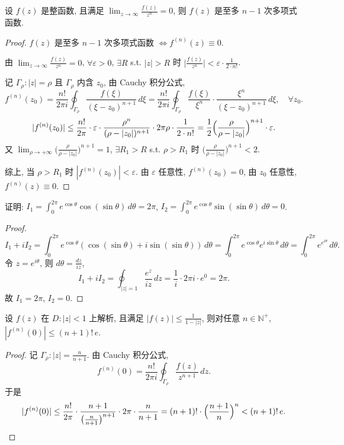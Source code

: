 \documentclass[theorem=false,mathfont=none,openany,sub3section]{easybook}
\begin{document}
\begin{example}
  设 $f(z)$ 是整函数, 且满足 $\lim_{z\to\infty}\frac{f(z)}{z^{n}}=0$, 则 $f(z)$ 是至多 $n-1$ 次多项式函数.
  \begin{proof}
    $f(z)$ 是至多 $n-1$ 次多项式函数 $\Leftrightarrow f^{(n)}(z)\equiv0$.

    由 $\lim_{z\to\infty}\frac{f(z)}{z^{n}}=0$, $\forall\varepsilon>0$, $\exists R$ s.t. $|z|>R$ 时 $\bigl|\frac{f(z)}{z^{n}}\bigr|<\varepsilon\cdot\frac{1}{2\cdot n!}$.

    记 $\Gamma_{\rho}:|z|=\rho$ 且 $\Gamma_{\rho}$ 内含 $z_{0}$, 由 Cauchy 积分公式,
    \[
    f^{(n)}(z_{0})=\frac{n!}{2\pi i}\oint_{\Gamma_{\rho}}\frac{f(\xi)}{(\xi-z_{0})^{n+1}}\,d\xi
    =\frac{n!}{2\pi i}\oint_{\Gamma_{\rho}}\frac{f(\xi)}{\xi^{n}}\cdot\frac{\xi^{n}}{(\xi-z_{0})^{n+1}}\,d\xi,\quad\forall z_{0}.
    \]
    \[
    |f^{(n)}(z_{0})|\leq\frac{n!}{2\pi}\cdot\varepsilon\cdot\frac{\rho^{n}}{(\rho-|z_{0}|)^{n+1}}\cdot2\pi\rho\cdot\frac{1}{2\cdot n!}
    =\frac{1}{2}\Bigl(\frac{\rho}{\rho-|z_{0}|}\Bigr)^{n+1}\cdot\varepsilon.
    \]
    又 $\lim_{\rho\to+\infty}\bigl(\frac{\rho}{\rho-|z_{0}|}\bigr)^{n+1}=1$, $\exists R_{1}>R$ s.t. $\rho>R_{1}$ 时 $\bigl(\frac{\rho}{\rho-|z_{0}|}\bigr)^{n+1}<2$.

    综上, 当 $\rho>R_{1}$ 时 $|f^{(n)}(z_{0})|<\varepsilon$. 由 $\varepsilon$ 任意性, $f^{(n)}(z_{0})=0$, 由 $z_{0}$ 任意性, $f^{(n)}(z)\equiv0$.
  \end{proof}
\end{example}

\begin{example}
  证明: $I_{1}=\int_{0}^{2\pi}e^{\cos\theta}\cos(\sin\theta)\,d\theta=2\pi$, $I_{2}=\int_{0}^{2\pi}e^{\cos\theta}\sin(\sin\theta)\,d\theta=0$.\par
  \begin{proof}
    \[
    I_{1}+iI_{2}=\int_{0}^{2\pi}e^{\cos\theta}(\cos(\sin\theta)+i\sin(\sin\theta))\,d\theta
    =\int_{0}^{2\pi}e^{\cos\theta}e^{i\sin\theta}\,d\theta
    =\int_{0}^{2\pi}e^{e^{i\theta}}\,d\theta.
    \]
    令 $z=e^{i\theta}$, 则 $d\theta=\frac{dz}{iz}$,
    \[
    I_{1}+iI_{2}=\oint_{|z|=1}\frac{e^{z}}{iz}\,dz
    =\frac{1}{i}\cdot2\pi i\cdot e^{0}=2\pi.
    \]
    故 $I_{1}=2\pi$, $I_{2}=0$.
  \end{proof}
\end{example}

\begin{example}
  设 $f(z)$ 在 $D:|z|<1$ 上解析, 且满足 $|f(z)|\leq\frac{1}{1-|z|}$, 则对任意 $n\in\mathbb N^{+}$,
  $|f^{(n)}(0)|\leq(n+1)!\,e$.
  \begin{proof}
    记 $\Gamma_{\rho}:|z|=\frac{n}{n+1}$. 由 Cauchy 积分公式,
    \[
    f^{(n)}(0)=\frac{n!}{2\pi i}\oint_{\Gamma_{\rho}}\frac{f(z)}{z^{n+1}}\,dz.
    \]
    于是
    \[
    |f^{(n)}(0)|\leq\frac{n!}{2\pi}\cdot
    \frac{n+1}{\bigl(\frac{n}{n+1}\bigr)^{n+1}}\cdot2\pi\cdot\frac{n}{n+1}
    =(n+1)!\cdot\Bigl(\frac{n+1}{n}\Bigr)^{n}<(n+1)!\,e.
    \]
  \end{proof}
\end{example}
\end{document}
